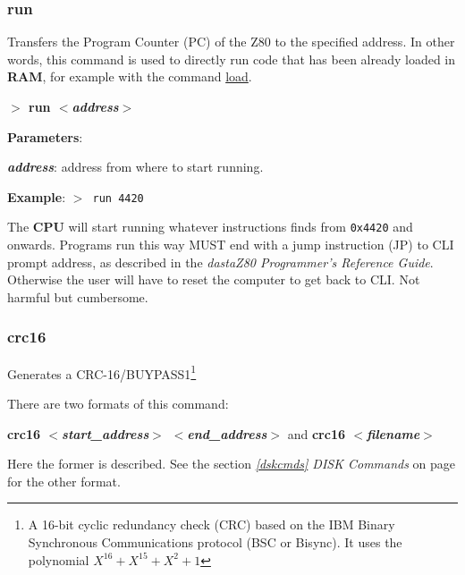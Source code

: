 \documentclass[a4paper,11pt]{article}
\begin{document}
        \subsubsection{{\color{blue}run}}

        Transfers the Program Counter (PC) of the Z80 to the specified address.
        In other words, this command is used to directly run code that has been
        already loaded in \textbf{RAM}, for example with the command 
        \hyperref[cmd:load]{load}.

        \hspace{1.9cm}\textbf{$>$ run \textit{$<$address$>$}}

        \textbf{Parameters}:

        \hspace{1cm}\textbf{\textit{address}}: address from where to start
        running.
        
        \textbf{Example}: \texttt{$>$ run 4420}

        The \textbf{CPU} will start running whatever instructions finds from
        \texttt{0x4420} and onwards. Programs run this way MUST end with a
        jump instruction (JP) to CLI prompt address, as described in the
        \textit{dastaZ80 Programmer’s Reference Guide}\cite{dastaz80progref}.
        Otherwise the user will have to reset the computer to get back to CLI.
        Not harmful but cumbersome.

        \subsubsection{{\color{blue}crc16}}
        Generates a CRC-16/BUYPASS1\footnote{A 16-bit cyclic redundancy
        check (CRC) based on the IBM Binary Synchronous Communications
        protocol\cite{ibmbsc} (BSC or Bisync). It uses the polynomial
        $X^{16} + X^{15} +X^2 + 1$}

        There are two formats of this command: 
        
        \textbf{crc16 \textit{$<$start\_address$>$ $<$end\_address$>$}}
        and \textbf{crc16 \textit{$<$filename$>$}} 
        
        Here the former is described. See the section \textit{\ref{dskcmds} 
        DISK Commands} on page \pageref{dskcmds} for the other format.
\end{document}
